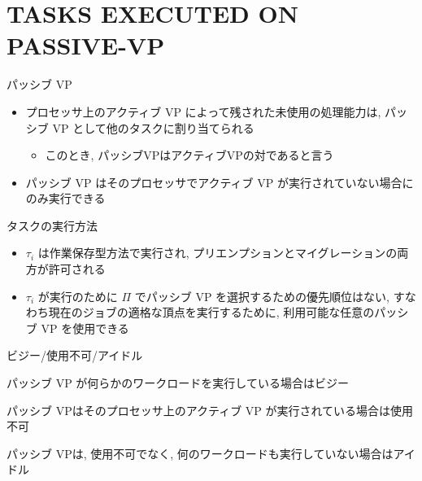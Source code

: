
\section{TASKS EXECUTED ON PASSIVE-VP}
\label{sec: tasks executed on passive-vp}

\begin{frame}{パッシブ VP}
    \begin{itemize}
        \item プロセッサ上のアクティブ VP によって残された未使用の処理能力は, パッシブ VP として他のタスクに割り当てられる
              \begin{itemize}
                  \item このとき, パッシブVPはアクティブVPの対であると言う
              \end{itemize}
        \item パッシブ VP はそのプロセッサでアクティブ VP が実行されていない場合にのみ実行できる
    \end{itemize}
\end{frame}

\begin{frame}{タスクの実行方法}
    \begin{itemize}
        \item $\tau_{i}$ は作業保存型方法で実行され, プリエンプションとマイグレーションの両方が許可される
        \item $\tau_{i}$ が実行のために $\Pi$ でパッシブ VP を選択するための優先順位はない, すなわち現在のジョブの適格な頂点を実行するために, 利用可能な任意のパッシブ VP を使用できる
    \end{itemize}
\end{frame}

\begin{frame}{ビジー/使用不可/アイドル}
    \begin{definition}[ビジー]
        パッシブ VP が何らかのワークロードを実行している場合はビジー
    \end{definition}
    \begin{definition}[使用不可]
        パッシブ VPはそのプロセッサ上のアクティブ VP が実行されている場合は使用不可
    \end{definition}
    \begin{definition}[アイドル]
        パッシブ VPは, 使用不可でなく, 何のワークロードも実行していない場合はアイドル
    \end{definition}
\end{frame}

